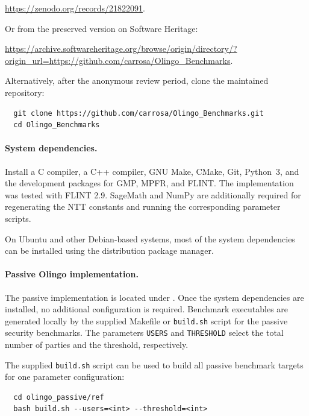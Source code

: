 \documentclass[nonacm,sigconf]{acmart}
\begin{document}
\begin{center}
  \url{https://zenodo.org/records/21822091}.
\end{center}

Or from the preserved version on Software Heritage:

\begin{center}
  \url{https://archive.softwareheritage.org/browse/origin/directory/?origin_url=https://github.com/carrosa/Olingo_Benchmarks}.
\end{center}

Alternatively, after the anonymous review period, clone the maintained repository:

\begin{verbatim}
  git clone https://github.com/carrosa/Olingo_Benchmarks.git
  cd Olingo_Benchmarks
\end{verbatim}

\paragraph{System dependencies.} Install a C compiler, a C++ compiler, GNU Make, CMake, Git, Python~3, and the development packages for GMP, MPFR, and FLINT. The implementation was tested with FLINT 2.9. SageMath and NumPy are additionally required for regenerating the NTT constants and running the corresponding parameter scripts.

On Ubuntu and other Debian-based systems, most of the system dependencies can be installed using the distribution package manager.

\paragraph{Passive Olingo implementation.} The passive implementation is located under . Once the system dependencies are installed, no additional configuration is required. Benchmark executables are generated locally by the supplied Makefile or \texttt{build.sh} script for the passive security benchmarks. The parameters \texttt{USERS} and \texttt{THRESHOLD} select the total number of parties and the threshold, respectively.

The supplied \texttt{build.sh} script can be used to build all passive benchmark targets for one parameter configuration:

\begin{verbatim}
  cd olingo_passive/ref
  bash build.sh --users=<int> --threshold=<int>
\end{verbatim}
\end{document}

